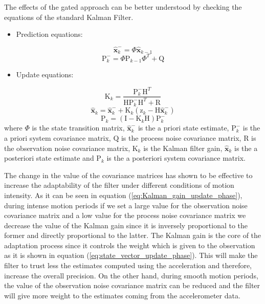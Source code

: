 \documentclass{IOS-Book-Article}
\begin{document}
The effects of the gated approach can be better understood by checking the equations of the standard Kalman Filter.

\begin{itemize}
\item Prediction equations:
\end{itemize}

\begin{equation}
\mathbf{\hat{x}}_{k}^{-}=\Phi\mathbf{\hat{x}}_{k-1}
\label{eq:Kal_fus_pred1}
\end{equation}
\begin{equation}
\mbox{P}_{k}^{-}=\Phi\mbox{P}_{k-1}\Phi^{T}+\mbox{Q}
\label{eq:Kal_fus_pred2}
\end{equation}

\begin{itemize}
\item Update equations:
\end{itemize}

\begin{equation}
\mbox{K}_{k}=\frac{\mbox{P}_{k}^{-}\mbox{H}^{T}}{\mbox{H}\mbox{P}_{k}^{-}\mbox{H}^{T}+\mbox{R}}
\label{eq:Kalman_gain_update_phase}
\end{equation}
\begin{equation}
\mathbf{\hat{x}}_{k}=\mathbf{\hat{x}}_{k}^{-}+\mbox{K}_{k}(\mbox{z}_{k}-\mbox{H}\mathbf{\hat{x}}_{k}^{-})
\label{eq:state_vector_update_phase}
\end{equation}
\begin{equation}
\mbox{P}_{k}=(\mbox{I}-\mbox{K}_{k}\mbox{H})\mbox{P}_{k}^{-}
\label{eq:covariance_matrix_update_phase}
\end{equation}
where $\Phi$ is the state transition matrix, $\mathbf{\hat{x}}_{k}^{-}$ is the a priori state estimate, $\mbox{P}_{k}^{-}$ is the a priori system covariance matrix, $\mbox{Q}$ is the process noise covariance matrix, R is the observation noise covariance matrix, $\mbox{K}_{k}$ is the Kalman filter gain, $\mathbf{\hat{x}}_{k}$ is the a posteriori state estimate and $\mbox{P}_{k}$ is the a posteriori system covariance matrix.

The change in the value of the covariance matrices has shown to be effective to increase the adaptability of the filter under different conditions of motion intensity. As it can be seen in equation (\ref{eq:Kalman_gain_update_phase}), during intense motion periods if we set a large value for the observation noise covariance matrix and a low value for the process noise covariance matrix we decrease the value of the Kalman gain since it is inversely proportional to the former and directly proportional to the latter. The Kalman gain is the core of the adaptation process since it controls the weight which is given to the observation as it is shown in equation (\ref{eq:state_vector_update_phase}). This will make the filter to trust less the estimates computed using the acceleration and therefore, increase the overall precision. On the other hand, during smooth motion periods, the value of the observation noise covariance matrix can be reduced and the filter will give more weight to the estimates coming from the accelerometer data.
\end{document}
